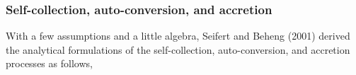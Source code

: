\begin{table}[h]
\begin{center}
\caption{Hydrometeors that result from binary collision. Collecting hydrometeors are written in the 1st row and collected hydrometeors are written in the 1st column.}
\label{table_sn14-16}
\end{center}
\end{table}

\subsubsection{Self-collection, auto-conversion, and accretion}
With a few assumptions and a little algebra, Seifert and Beheng (2001) derived the analytical formulations of the self-collection, auto-conversion, and accretion processes as follows,

